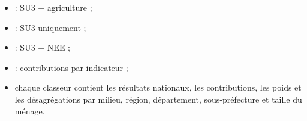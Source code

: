 \documentclass[11pt,a4paper]{article}
\begin{document}
\begin{itemize}
  \item {} : SU3 + agriculture ;
  \item {} : SU3 uniquement ;
  \item {} : SU3 + NEE ;
  \item {} : contributions par indicateur ;
  \item chaque classeur contient les résultats nationaux, les contributions, les poids et les
  désagrégations par milieu, région, département, sous-préfecture et taille du ménage.
\end{itemize}
\end{document}
